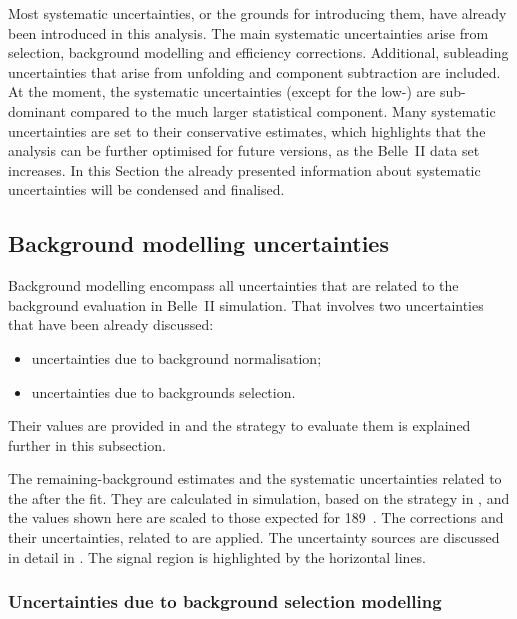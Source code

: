 Most systematic uncertainties, or the grounds for introducing them, have already been introduced in this analysis.
The main systematic uncertainties arise from selection, background modelling and efficiency corrections.
Additional, subleading uncertainties that arise from unfolding and \BtoXdgamma component subtraction are included.
At the moment, the systematic uncertainties (except for the low-\EB) are sub-dominant compared to the much larger statistical component.
Many systematic uncertainties are set to their conservative estimates, 
which highlights that the analysis can be further optimised for future versions, as the Belle~II data set increases.
In this Section the already presented information about systematic uncertainties will be condensed and finalised.

\subsection{Background modelling uncertainties}\label{sec:background_uncertainties}

Background modelling encompass all uncertainties that are related to the background evaluation in Belle~II simulation.
That involves two uncertainties that have been already discussed:
\begin{itemize}
    \item uncertainties due to background normalisation;
    \item uncertainties due to backgrounds selection.
\end{itemize}
Their values are provided in  and the strategy to evaluate them is explained further in this subsection.

\begin{table}[htbp!]
    \centering
    \caption{\label{tab:background_uncertainties} 
    The remaining-\BB background estimates and the systematic uncertainties related to the  after the \Mbc fit.
    They are calculated in simulation, based on the strategy in , 
    and the values shown here are scaled to those expected for 189~\invfb.
    The corrections and their uncertainties, related to  are applied.
    The uncertainty sources are discussed in detail in .
    The signal region is highlighted by the horizontal lines.
    }
    
\end{table}

\subsubsection{Uncertainties due to background selection modelling}\label{sec:correction_systematic}

